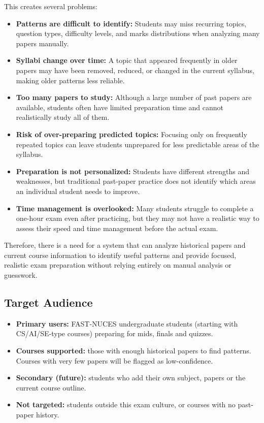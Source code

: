 \documentclass[11pt,a4paper]{article}
\begin{document}
This creates several problems:
\begin{itemize}
  \item \textbf{Patterns are difficult to identify:} Students may miss recurring topics, question types, difficulty levels, and marks distributions when analyzing many papers manually.
  \item \textbf{Syllabi change over time:} A topic that appeared frequently in older papers may have been removed, reduced, or changed in the current syllabus, making older patterns less reliable.
  \item \textbf{Too many papers to study:} Although a large number of past papers are available, students often have limited preparation time and cannot realistically study all of them.
  \item \textbf{Risk of over-preparing predicted topics:} Focusing only on frequently repeated topics can leave students unprepared for less predictable areas of the syllabus.
  \item \textbf{Preparation is not personalized:} Students have different strengths and weaknesses, but traditional past-paper practice does not identify which areas an individual student needs to improve.
  \item \textbf{Time management is overlooked:} Many students struggle to complete a one-hour exam even after practicing, but they may not have a realistic way to assess their speed and time management before the actual exam.
\end{itemize}
Therefore, there is a need for a system that can analyze historical papers and current course information to identify useful patterns and provide focused, realistic exam preparation without relying entirely on manual analysis or guesswork.

\subsection{Target Audience}
\label{sec:audience}
\begin{itemize}
  \item \textbf{Primary users:} FAST-NUCES undergraduate students (starting with CS/AI/SE-type courses) preparing for mids, finals and quizzes.
  \item \textbf{Courses supported:} those with enough historical papers to find patterns. Courses with very few papers will be flagged as low-confidence.
  \item \textbf{Secondary (future):} students who add their own subject, papers or the current course outline.
  \item \textbf{Not targeted:} students outside this exam culture, or courses with no past-paper history.
\end{itemize}
\end{document}
